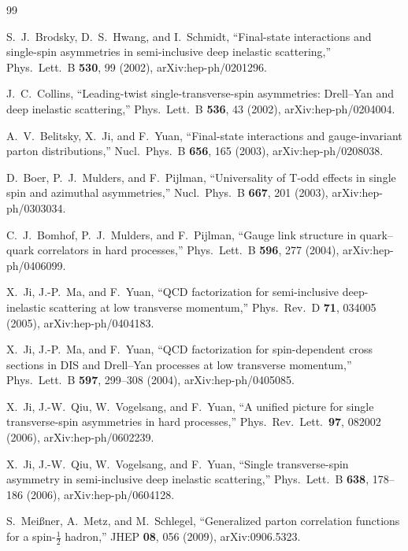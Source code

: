 \documentclass[11pt]{article}
\begin{document}
\small
\begin{thebibliography}{99}

S.~J.~Brodsky, D.~S.~Hwang, and I.~Schmidt,
``Final-state interactions and single-spin asymmetries in semi-inclusive deep
inelastic scattering,''
Phys.\ Lett.\ B \textbf{530}, 99 (2002), arXiv:hep-ph/0201296.

J.~C.~Collins,
``Leading-twist single-transverse-spin asymmetries: Drell--Yan and deep
inelastic scattering,''
Phys.\ Lett.\ B \textbf{536}, 43 (2002), arXiv:hep-ph/0204004.

A.~V.~Belitsky, X.~Ji, and F.~Yuan,
``Final-state interactions and gauge-invariant parton distributions,''
Nucl.\ Phys.\ B \textbf{656}, 165 (2003), arXiv:hep-ph/0208038.

D.~Boer, P.~J.~Mulders, and F.~Pijlman,
``Universality of T-odd effects in single spin and azimuthal asymmetries,''
Nucl.\ Phys.\ B \textbf{667}, 201 (2003), arXiv:hep-ph/0303034.

C.~J.~Bomhof, P.~J.~Mulders, and F.~Pijlman,
``Gauge link structure in quark--quark correlators in hard processes,''
Phys.\ Lett.\ B \textbf{596}, 277 (2004), arXiv:hep-ph/0406099.

X.~Ji, J.-P.~Ma, and F.~Yuan,
``QCD factorization for semi-inclusive deep-inelastic scattering at low
transverse momentum,''
Phys.\ Rev.\ D \textbf{71}, 034005 (2005), arXiv:hep-ph/0404183.

X.~Ji, J.-P.~Ma, and F.~Yuan,
``QCD factorization for spin-dependent cross sections in DIS and Drell--Yan
processes at low transverse momentum,''
Phys.\ Lett.\ B \textbf{597}, 299--308 (2004), arXiv:hep-ph/0405085.

X.~Ji, J.-W.~Qiu, W.~Vogelsang, and F.~Yuan,
``A unified picture for single transverse-spin asymmetries in hard
processes,''
Phys.\ Rev.\ Lett.\ \textbf{97}, 082002 (2006), arXiv:hep-ph/0602239.

X.~Ji, J.-W.~Qiu, W.~Vogelsang, and F.~Yuan,
``Single transverse-spin asymmetry in semi-inclusive deep inelastic
scattering,''
Phys.\ Lett.\ B \textbf{638}, 178--186 (2006), arXiv:hep-ph/0604128.

S.~Mei{\ss}ner, A.~Metz, and M.~Schlegel,
``Generalized parton correlation functions for a spin-\(\tfrac12\) hadron,''
JHEP \textbf{08}, 056 (2009), arXiv:0906.5323.


\end{thebibliography}
\end{document}

